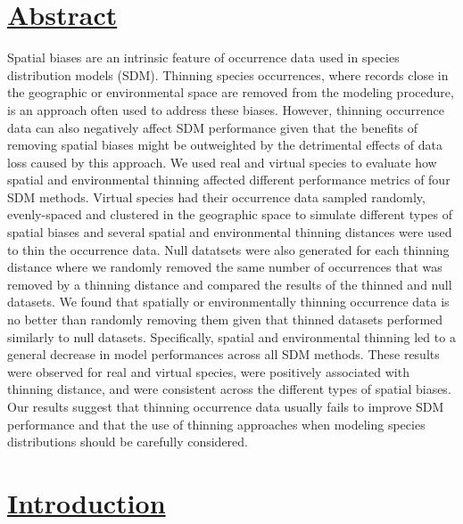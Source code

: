 

\section*{\textbf{\underline{Abstract}}}

Spatial biases are an intrinsic feature of occurrence data used in species distribution models (SDM). Thinning species occurrences, where records close in the geographic or environmental space are removed from the modeling procedure, is an approach often used to address these biases. However, thinning occurrence data can also negatively affect SDM performance given that the benefits of removing spatial biases might be outweighted by the detrimental effects of data loss caused by this approach. We used real and virtual species to evaluate how spatial and environmental thinning affected different performance metrics of four SDM methods. Virtual species had their occurrence data sampled randomly, evenly-spaced and clustered in the geographic space to simulate different types of spatial biases and several spatial and environmental thinning distances were used to thin the occurrence data. Null datatsets were also generated for each thinning distance where we randomly removed the same number of occurrences that was removed by a thinning distance and compared the results of the thinned and null datasets. We found that spatially or environmentally thinning occurrence data is no better than randomly removing them given that thinned datasets performed similarly to null datasets. Specifically, spatial and environmental thinning led to a general decrease in model performances across all SDM methods. These results were observed for real and virtual species, were positively associated with thinning distance, and were consistent across the different types of spatial biases. Our results suggest that thinning occurrence data usually fails to improve SDM performance and that the use of thinning approaches when modeling species distributions should be carefully considered. 






\section*{\textbf{\underline{Introduction}}}

